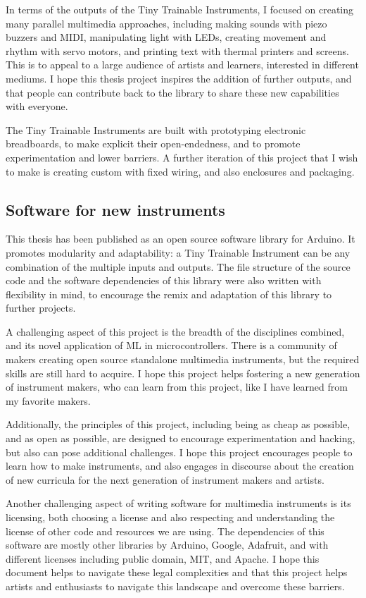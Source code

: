 In terms of the outputs of the Tiny Trainable Instruments, I focused on creating many parallel multimedia approaches, including making sounds with piezo buzzers and MIDI, manipulating light with LEDs, creating movement and rhythm with servo motors, and printing text with thermal printers and screens. This is to appeal to a large audience of artists and learners, interested in different mediums. I hope this thesis project inspires the addition of further outputs, and that people can contribute back to the library to share these new capabilities with everyone.

The Tiny Trainable Instruments are built with prototyping electronic breadboards, to make explicit their open-endedness, and to promote experimentation and lower barriers. A further iteration of this project that I wish to make is creating custom  with fixed wiring, and also enclosures and packaging.

\subsection{Software for new instruments}

This thesis has been published as an open source software library for Arduino. It promotes modularity and adaptability: a Tiny Trainable Instrument can be any combination of the multiple inputs and outputs. The file structure of the source code and the software dependencies of this library were also written with flexibility in mind, to encourage the remix and adaptation of this library to further projects.

A challenging aspect of this project is the breadth of the disciplines combined, and its novel application of \acrshort{ML} in microcontrollers. There is a community of makers creating open source standalone multimedia instruments, but the required skills are still hard to acquire. I hope this project helps fostering a new generation of instrument makers, who can learn from this project, like I have learned from my favorite makers.

Additionally, the principles of this project, including being as cheap as possible, and as open as possible, are designed to encourage experimentation and hacking, but also can pose additional challenges. I hope this project encourages people to learn how to make instruments, and also engages in discourse about the creation of new curricula for the next generation of instrument makers and artists.

Another challenging aspect of writing software for multimedia instruments is its licensing, both choosing a license and also respecting and understanding the license of other code and resources we are using. The dependencies of this software are mostly other libraries by Arduino, Google, Adafruit, and with different licenses including public domain, MIT, and Apache. I hope this document helps to navigate these legal complexities and that this project helps artists and enthusiasts to navigate this landscape and overcome these barriers.

